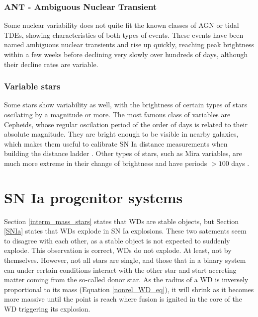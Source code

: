 \documentclass[a4paper,oneside,12pt, class=Latex/Classes/PhDthesisPSnPDF, crop=false]{standalone}
\begin{document}
\subsubsection{ANT - Ambiguous Nuclear Transient}
 Some nuclear variability does not quite fit the known classes of AGN or tidal TDEs, showing characteristics of both types of events. These events have been named ambiguous nuclear transients \citep[ANTS;][]{Kankare_ANT, 2020ohl_Hinkle, Hinkle_MIR_ANT_echo, Hinkle_Extreme_nuclear_transients/ANTs, wiseman_ztfants} and rise up quickly, reaching peak brightness within a few weeks before declining very slowly over hundreds of days, although their decline rates are variable. 


\subsubsection{Variable stars}
Some stars show variability as well, with the brightness of certain types of stars oscilating by a magnitude or more. The most famous class of variables are Cepheids, whose regular oscilation period of the order of days is related to their absolute magnitude. They are bright enough to be visible in nearby galaxies, which makes them useful to calibrate SN Ia distance measurements when building the distance ladder \citep{Cepheids_Gibson, Cepheids_Saha}. Other types of stars, such as Mira variables, are much more extreme in their change of brightness and have periods $>100$ days \citep{Mira_varibs}.


\section{SN Ia progenitor systems}
\label{Ia_progenitors}
Section \ref{interm_mass_stars} states that WDs are stable objects, but Section \ref{SNIa} states that WDs explode in SN Ia explosions. These two satements seem to disagree with each other, as a stable object is not expected to suddenly explode. This observation is correct, WDs do not explode. At least, not by themselves. However, not all stars are single, and those that in a binary system can under certain conditions interact with the other star and start accreting matter coming from the so-called donor star. As the radius of a WD is inversely proportional to its mass (Equation \ref{nonrel_WD_eq}), it will shrink as it becomes more massive until the point is reach where fusion is ignited in the core of the WD triggering its explosion.
\end{document}
